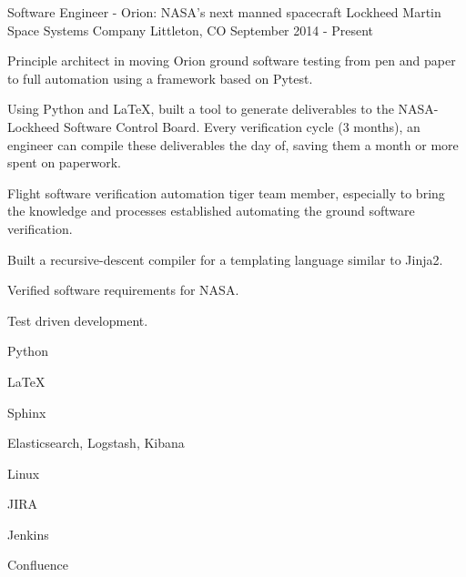 

\begin{cventries}

  \cventry
    {Software Engineer - Orion: NASA's next manned spacecraft} %
    {Lockheed Martin Space Systems Company} %
    {Littleton, CO} %
    {September 2014 - Present} %
    {
      \begin{cvitems} %
        \item {Principle architect in moving Orion ground software testing from pen and paper to full automation using a framework based on Pytest.}
        \item {Using Python and LaTeX, built a tool to generate deliverables to the NASA-Lockheed Software Control Board.  Every verification cycle (3 months), an engineer can compile these deliverables the day of, saving them a month or more spent on paperwork.}
        \item {Flight software verification automation tiger team member, especially to bring the knowledge and processes established automating the ground software verification.}
        \item {Built a recursive-descent compiler for a templating language similar to Jinja2.}
        \item {Verified software requirements for NASA.}
        \item {Test driven development.}
      \end{cvitems}
    }
    \begin{cventryskills}
      \item Python
      \item LaTeX
      \item Sphinx
      \item Elasticsearch, Logstash, Kibana
      \item Linux
      \item JIRA
      \item Jenkins
      \item Confluence
    \end{cventryskills}


\end{cventries}

